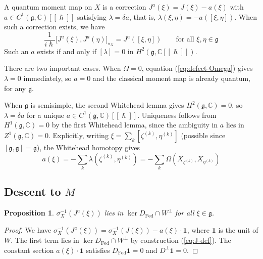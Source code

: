 \documentclass[
  12pt,
  a4paper, oneside
]{report}
\renewcommand{\hbar}{\hslash}
\theoremstyle{bolddef}
\newtheorem{proposition}[theorem]{Proposition}
\theoremstyle{remark}
\numberwithin{equation}{chapter}
\begin{document}
A quantum moment map on $X$ is a correction $J^a(\xi) = J(\xi) - a(\xi)$ with $a \in C^1(\mathfrak{g}, \mathbb{C})[[\hbar]]$ satisfying $\lambda = \delta a$, that is, $\lambda(\xi, \eta) = -a([\xi, \eta])$. When such a correction exists, we have
\begin{equation}\label{eq:QMM-X}
\frac{1}{i\hbar}\big[J^a(\xi), J^a(\eta)\big]_{\star_X} = J^a([\xi, \eta]) \qquad \text{for all } \xi, \eta \in \mathfrak{g}
\end{equation}
Such an $a$ exists if and only if $[\lambda] = 0$ in $H^2(\mathfrak{g}, \mathbb{C}[[\hbar]])$.

There are two important cases. When $\Omega = 0$, equation (\ref{eq:defect-Omega}) gives $\lambda = 0$ immediately, so $a = 0$ and the classical moment map is already quantum, for any $\mathfrak{g}$.

When $\mathfrak{g}$ is semisimple, the second Whitehead lemma gives $H^2(\mathfrak{g}, \mathbb{C}) = 0$, so $\lambda = \delta a$ for a unique $a \in C^1(\mathfrak{g}, \mathbb{C})[[\hbar]]$. Uniqueness follows from $H^1(\mathfrak{g}, \mathbb{C}) = 0$ by the first Whitehead lemma, since the ambiguity in $a$ lies in $Z^1(\mathfrak{g}, \mathbb{C}) = 0$. Explicitly, writing $\xi = \sum_k [\zeta^{(k)}, \eta^{(k)}]$ (possible since $[\mathfrak{g}, \mathfrak{g}] = \mathfrak{g}$), the Whitehead homotopy gives
\begin{equation}\label{eq:whitehead-a}
a(\xi) = -\sum_k \lambda(\zeta^{(k)}, \eta^{(k)}) = -\sum_k \Omega(X_{\zeta^{(k)}}, X_{\eta^{(k)}})
\end{equation}


\subsection*{Descent to $M$}

\begin{proposition}\label{prop:Ja-in-Wperp}
$\sigma_X^{-1}(J^a(\xi))$ lies in $\ker D_{\mathrm{Fed}} \cap W^\perp$ for all $\xi \in \mathfrak{g}$.
\end{proposition}
\begin{proof}
We have $\sigma_X^{-1}(J^a(\xi)) = \sigma_X^{-1}(J(\xi)) - a(\xi) \cdot \mathbf{1}$, where $\mathbf{1}$ is the unit of $W$. The first term lies in $\ker D_{\mathrm{Fed}} \cap W^\perp$ by construction (\ref{eq:J-def}). The constant section $a(\xi) \cdot \mathbf{1}$ satisfies $D_{\mathrm{Fed}} \mathbf{1} = 0$ and $D^\perp \mathbf{1} = 0$.
\end{proof}
\end{document}
